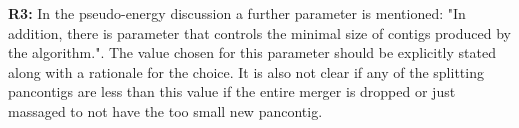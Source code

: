 \documentclass[aps,rmp,onecolumn]{revtex4-1}
\newcommand{\Marco}[1]{{\color{orange}Marco: #1}}
\newcommand{\Liam}[1]{{\color{teal}Liam: #1}}
\newcommand{\reviewer}[2]{\textbf{#1:} #2\vskip 5mm}
\begin{document}
\reviewer{R3}{In the pseudo-energy discussion a further parameter is mentioned: "In addition, there is parameter that controls the minimal size of contigs produced by the algorithm.". The value chosen for this parameter should be explicitly stated along with a rationale for the choice. It is also not clear if any of the splitting pancontigs are less than this value if the entire merger is dropped or just massaged to not have the too small new pancontig.}
\end{document}
